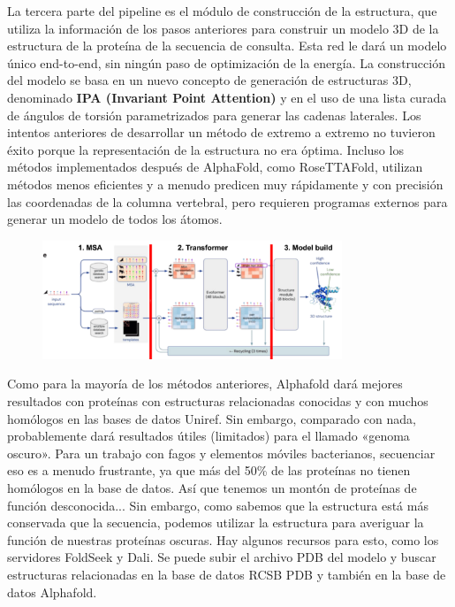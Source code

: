 La tercera parte del pipeline es el módulo de construcción de la estructura, que utiliza la información de los pasos anteriores para construir un modelo 3D de la estructura de la proteína de la secuencia de consulta. Esta red le dará un modelo único end-to-end, sin ningún paso de optimización de la energía. La construcción del modelo se basa en un nuevo concepto de generación de estructuras 3D, denominado \textbf{IPA (Invariant Point Attention)} y en el uso de una lista curada de ángulos de torsión parametrizados para generar las cadenas laterales. Los intentos anteriores de desarrollar un método de extremo a extremo no tuvieron éxito porque la representación de la estructura no era óptima. Incluso los métodos implementados después de AlphaFold, como RoseTTAFold, utilizan métodos menos eficientes y a menudo predicen muy rápidamente y con precisión las coordenadas de la columna vertebral, pero requieren programas externos para generar un modelo de todos los átomos.

\begin{figure}[h]
\centering
\includegraphics[width = 0.8\textwidth]{figs/alphafold2.png}
\end{figure}

Como para la mayoría de los métodos anteriores, Alphafold dará mejores resultados con proteínas con estructuras relacionadas conocidas y con muchos homólogos en las bases de datos Uniref. Sin embargo, comparado con nada, probablemente dará resultados útiles (limitados) para el llamado «genoma oscuro». Para un trabajo con fagos y elementos móviles bacterianos, secuenciar eso es a menudo frustrante, ya que más del 50\% de las proteínas no tienen homólogos en la base de datos. Así que tenemos un montón de proteínas de función desconocida... Sin embargo, como sabemos que la estructura está más conservada que la secuencia, podemos utilizar la estructura para averiguar la función de nuestras proteínas oscuras. Hay algunos recursos para esto, como los servidores FoldSeek y Dali. Se puede subir el archivo PDB del modelo y buscar estructuras relacionadas en la base de datos RCSB PDB y también en la base de datos Alphafold.

